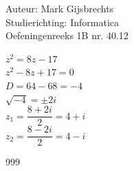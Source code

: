 \documentclass[a4paper]{article}
\begin{document}
\noindent \large Auteur: Mark Gijsbrechts \\
\noindent \large Studierichting: Informatica\\
\noindent \large Oefeningenreeks 1B nr. 40.12\\

\medskip

\normalsize



$z^2 = 8z - 17$ \\

$z^2 -8z + 17 = 0$ \\

$D = 64 - 68 = -4$ \\

$\sqrt{-4} =  \pm2i$ \\

$z_{1} = \dfrac{8 + 2i}{2} = 4 + i$ \\ 

$z_{2} = \dfrac{8 - 2i}{2} = 4 - i$ \\ 




\begin{thebibliography}{999}
\end{thebibliography}
\end{document}
